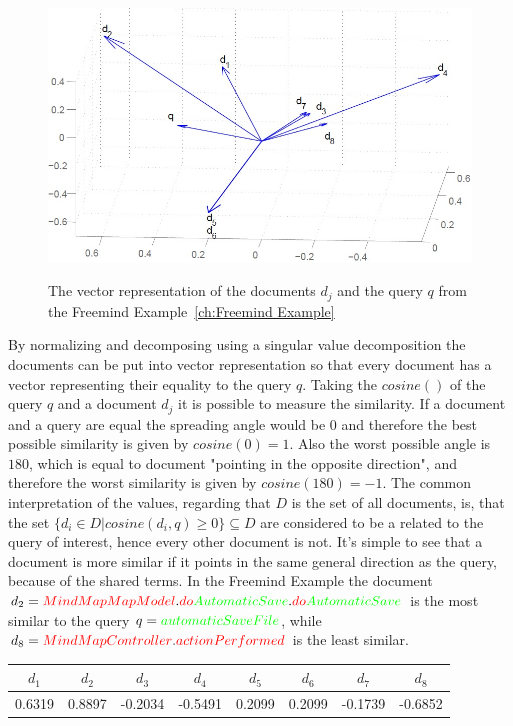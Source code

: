 \begin{figure}
  \centering
  \includegraphics[width=\linewidth]{src/pic/lsf-vectors}
  \label{pic:lsi_vectors}
  \caption{The vector representation of the documents $d_j$ and the query $q$ from the Freemind Example~\ref{ch:Freemind Example}}
\end{figure}
By normalizing and decomposing using a singular value decomposition the documents can be put into vector representation so that every document has a vector representing their equality to the query $q$. Taking the $cosine()$ of the query $q$ and a document $d_j$ it is possible to measure the similarity. If a document and a query are equal the spreading angle would be $0$ and therefore the best possible similarity is given by $cosine(0)=1$. Also the worst possible angle is $180$, which is equal to document "pointing in the opposite direction", and therefore the worst similarity is given by $cosine(180)=-1$. The common interpretation of the values, regarding that $D$ is the set of all documents, is, that the set $\{d_i \in D| cosine(d_i,q) \ge 0 \} \subseteq D$ are considered to be a related to the query of interest, hence every other document is not. It's simple to see that a document is more similar if it points in the same general direction as the query, because of the shared terms. In the Freemind Example the document $d_2=\color{red}MindMapMapModel\color{black}.\color{red}do\color{green}AutomaticSave\color{black}.\color{red}do\color{green}AutomaticSave\color{black}$ is the most similar to the query $q=\color{green}automaticSaveFile\color{black}$, while $d_8=\color{red}MindMapController\color{black}.\color{red}actionPerformed\color{black}$ is the least similar.
\begin{center}
  \begin{tabular}{ c c c c c c c c }
    \hline
    $d_1$ & $d_2$ & $d_3$ & $d_4$ & $d_5$ & $d_6$ & $d_7$ & $d_8$ \\ \hline
    0.6319 & 0.8897 & -0.2034 & -0.5491 & 0.2099 & 0.2099 & -0.1739 & -0.6852 \\ \hline
  \end{tabular}
  \label{table:lsi-values}
\end{center}
